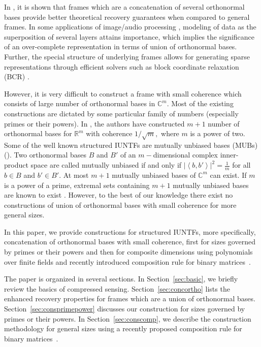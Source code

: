 \documentclass{IEEEtran}
\begin{document}
In \cite{elad_2002,feuer_2002,tropp_2004, grib_2002}, it is shown that frames
which are
a concatenation of several orthonormal bases provide better theoretical
recovery guarantees when compared to general frames. 
In some applications of image/audio processing \cite{molla_2004, starck_2004},
modeling of data as the superposition of several layers attains importance,
which implies the significance of an over-complete representation in terms of
union of orthonormal bases. Further, the special structure of underlying frames
allows for generating sparse representations through efficient solvers such as
block coordinate relaxation (BCR) \cite{sardy_2000}.

 However, it is very
difficult to construct a frame with small coherence which consists of large
number of orthonormal bases in $\mathbb{C}^m$.
Most of the existing constructions are dictated by some particular family
of numbers
(especially primes or their powers). In \cite{cal_1997, stro_2003}, the
authors have
constructed $m+1$ number of orthonormal bases for $\mathbb{R}^{m}$ with
coherence $1/\sqrt{m},$ where $m$ is a power of two. Some of
the well known structured IUNTFs are mutually unbiased bases (MUBs)
(\cite{klap_2003,san_2004,sey_2014,sey_2011,woc_2004}). Two orthonormal bases
$B$
and $B'$ of an $m-$dimensional complex inner-product space are called mutually
unbiased if and only
if $|\left\langle b, b' \right\rangle|^{2}=\frac{1}{m}$ for all $ b \in B$
and $b' \in B'.$
At most $m+1$ mutually unbiased bases of $\mathbb{C}^{m}$ can exist. If $m$ is
a power of a prime,
extremal sets containing $m+1$ mutually unbiased bases are known to exist
\cite{klap_2003,san_2004}.
However, to the
best of our knowledge there exist no constructions of union of
orthonormal bases with small coherence for more general sizes.

 
In this paper, we provide constructions for structured IUNTFs, more
specifically, concatenation
of orthonormal bases with small coherence, first for sizes governed by primes
or their powers and
then for composite dimensions using polynomials over
finite fields and recently introduced composition rule for binary matrices~\cite{pra_2016}. 

The paper is
organized in several sections. In Section~\ref{sec:basic}, we briefly review
the basics of compressed sensing. Section~\ref{sec:concortho} 
lists the enhanced recovery properties for frames which are a union of
orthonormal bases. Section~\ref{sec:consprimepower} discusses our
construction for sizes governed by primes or their powers.
In Section~\ref{sec:conscomp}, we describe the construction methodology
for general sizes using a recently proposed composition rule for binary
matrices~\cite{pra_2016}.
\end{document}
